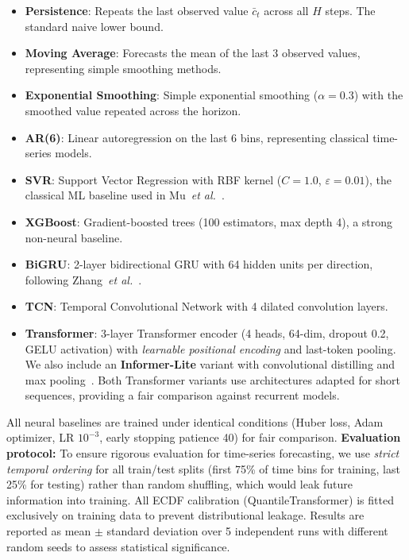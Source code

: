 \documentclass[journal]{IEEEtran}
\begin{document}
\begin{itemize}
\item \textbf{Persistence}: Repeats the last observed value $\bar{c}_t$ across all $H$ steps. The standard naive lower bound.
\item \textbf{Moving Average}: Forecasts the mean of the last 3 observed values, representing simple smoothing methods.
\item \textbf{Exponential Smoothing}: Simple exponential smoothing ($\alpha{=}0.3$) with the smoothed value repeated across the horizon.
\item \textbf{AR(6)}: Linear autoregression on the last 6 bins, representing classical time-series models.
\item \textbf{SVR}: Support Vector Regression with RBF kernel ($C{=}1.0$, $\varepsilon{=}0.01$), the classical ML baseline used in Mu~\emph{et al.}~\cite{Mu2023IPSO}.
\item \textbf{XGBoost}: Gradient-boosted trees (100 estimators, max depth 4), a strong non-neural baseline.
\item \textbf{BiGRU}: 2-layer bidirectional GRU with 64 hidden units per direction, following Zhang~\emph{et al.}~\cite{Zhang2024TRESP}.
\item \textbf{TCN}: Temporal Convolutional Network with 4 dilated convolution layers.
\item \textbf{Transformer}: 3-layer Transformer encoder (4 heads, 64-dim, dropout 0.2, GELU activation) with \emph{learnable positional encoding} and last-token pooling. We also include an \textbf{Informer-Lite} variant with convolutional distilling and max pooling~\cite{zhou2021informer}. Both Transformer variants use architectures adapted for short sequences, providing a fair comparison against recurrent models.
\end{itemize}

All neural baselines are trained under identical conditions (Huber loss, Adam optimizer, LR $10^{-3}$, early stopping patience 40) for fair comparison. \textbf{Evaluation protocol:} To ensure rigorous evaluation for time-series forecasting, we use \emph{strict temporal ordering} for all train/test splits (first 75\% of time bins for training, last 25\% for testing) rather than random shuffling, which would leak future information into training. All ECDF calibration (QuantileTransformer) is fitted exclusively on training data to prevent distributional leakage. Results are reported as mean $\pm$ standard deviation over 5 independent runs with different random seeds to assess statistical significance.
\end{document}
